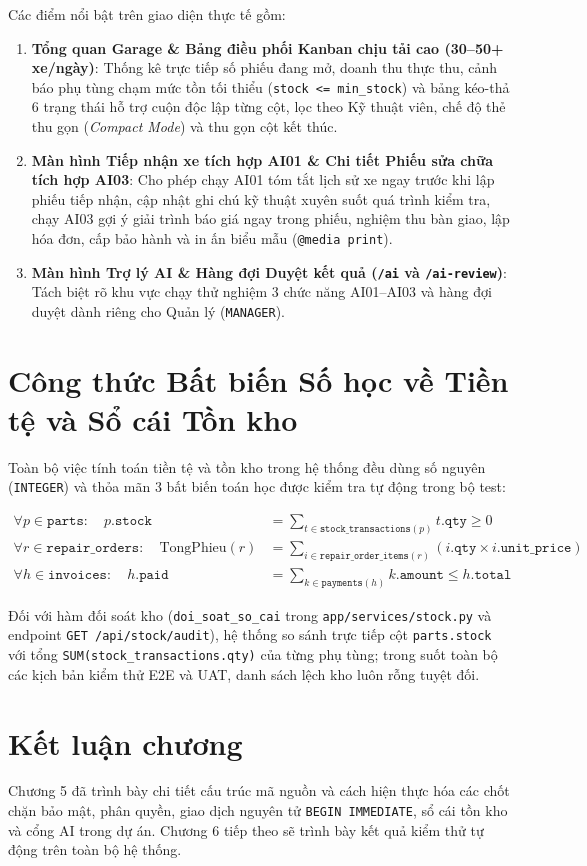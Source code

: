 Các điểm nổi bật trên giao diện thực tế gồm:
\begin{enumerate}[noitemsep,topsep=2pt]
  \item \textbf{Tổng quan Garage \& Bảng điều phối Kanban chịu tải cao (30--50+ xe/ngày)}: Thống kê trực tiếp số phiếu đang mở, doanh thu thực thu, cảnh báo phụ tùng chạm mức tồn tối thiểu (\texttt{stock <= min\_stock}) và bảng kéo-thả 6 trạng thái hỗ trợ cuộn độc lập từng cột, lọc theo Kỹ thuật viên, chế độ thẻ thu gọn (\textit{Compact Mode}) và thu gọn cột kết thúc.
  \item \textbf{Màn hình Tiếp nhận xe tích hợp AI01 \& Chi tiết Phiếu sửa chữa tích hợp AI03}: Cho phép chạy AI01 tóm tắt lịch sử xe ngay trước khi lập phiếu tiếp nhận, cập nhật ghi chú kỹ thuật xuyên suốt quá trình kiểm tra, chạy AI03 gợi ý giải trình báo giá ngay trong phiếu, nghiệm thu bàn giao, lập hóa đơn, cấp bảo hành và in ấn biểu mẫu (\texttt{@media print}).
  \item \textbf{Màn hình Trợ lý AI \& Hàng đợi Duyệt kết quả (\texttt{/ai} và \texttt{/ai-review})}: Tách biệt rõ khu vực chạy thử nghiệm 3 chức năng AI01--AI03 và hàng đợi duyệt dành riêng cho Quản lý (\texttt{MANAGER}).
\end{enumerate}

\section{Công thức Bất biến Số học về Tiền tệ và Sổ cái Tồn kho}

Toàn bộ việc tính toán tiền tệ và tồn kho trong hệ thống đều dùng số nguyên (\texttt{INTEGER}) và thỏa mãn 3 bất biến toán học được kiểm tra tự động trong bộ test:

\begin{align}
\forall p \in \texttt{parts}:\quad p.\texttt{stock} &= \sum_{t \in \texttt{stock\_transactions}(p)} t.\texttt{qty} \ge 0 \\
\forall r \in \texttt{repair\_orders}:\quad \text{TongPhieu}(r) &= \sum_{i \in \texttt{repair\_order\_items}(r)} \left( i.\texttt{qty} \times i.\texttt{unit\_price} \right) \\
\forall h \in \texttt{invoices}:\quad h.\texttt{paid} &= \sum_{k \in \texttt{payments}(h)} k.\texttt{amount} \le h.\texttt{total}
\end{align}

Đối với hàm đối soát kho (\texttt{doi\_soat\_so\_cai} trong \texttt{app/services/stock.py} và endpoint \texttt{GET /api/stock/audit}), hệ thống so sánh trực tiếp cột \texttt{parts.stock} với tổng \texttt{SUM(stock\_transactions.qty)} của từng phụ tùng; trong suốt toàn bộ các kịch bản kiểm thử E2E và UAT, danh sách lệch kho luôn rỗng tuyệt đối.

\section{Kết luận chương}

Chương 5 đã trình bày chi tiết cấu trúc mã nguồn và cách hiện thực hóa các chốt chặn bảo mật, phân quyền, giao dịch nguyên tử \texttt{BEGIN IMMEDIATE}, sổ cái tồn kho và cổng AI trong dự án. Chương 6 tiếp theo sẽ trình bày kết quả kiểm thử tự động trên toàn bộ hệ thống.
